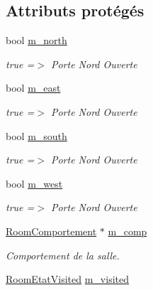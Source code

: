 \subsection*{Attributs protégés}
\begin{DoxyCompactItemize}
\item 
\hypertarget{class_room_aeb245b2ac8baea5fe4aa2b581ce1e4b9}{bool \hyperlink{class_room_aeb245b2ac8baea5fe4aa2b581ce1e4b9}{m\-\_\-north}}\label{class_room_aeb245b2ac8baea5fe4aa2b581ce1e4b9}

\begin{DoxyCompactList}\small\item\em true =$>$ Porte Nord Ouverte \end{DoxyCompactList}\item 
\hypertarget{class_room_ab6e6bf0a1168694a27a13a8acf1452a2}{bool \hyperlink{class_room_ab6e6bf0a1168694a27a13a8acf1452a2}{m\-\_\-east}}\label{class_room_ab6e6bf0a1168694a27a13a8acf1452a2}

\begin{DoxyCompactList}\small\item\em true =$>$ Porte Nord Ouverte \end{DoxyCompactList}\item 
\hypertarget{class_room_aac69181b1659a52d6e0259f7bfaae182}{bool \hyperlink{class_room_aac69181b1659a52d6e0259f7bfaae182}{m\-\_\-south}}\label{class_room_aac69181b1659a52d6e0259f7bfaae182}

\begin{DoxyCompactList}\small\item\em true =$>$ Porte Nord Ouverte \end{DoxyCompactList}\item 
\hypertarget{class_room_a645eb7a60abecb39a933f6ddd66c907d}{bool \hyperlink{class_room_a645eb7a60abecb39a933f6ddd66c907d}{m\-\_\-west}}\label{class_room_a645eb7a60abecb39a933f6ddd66c907d}

\begin{DoxyCompactList}\small\item\em true =$>$ Porte Nord Ouverte \end{DoxyCompactList}\item 
\hypertarget{class_room_a2eef23a19d68165b2afda676156fec0f}{\hyperlink{class_room_comportement}{Room\-Comportement} $\ast$ \hyperlink{class_room_a2eef23a19d68165b2afda676156fec0f}{m\-\_\-comp}}\label{class_room_a2eef23a19d68165b2afda676156fec0f}

\begin{DoxyCompactList}\small\item\em Comportement de la salle. \end{DoxyCompactList}\item 
\hypertarget{class_room_aa1641c60eea54c1633d3d1b4f04b34d0}{\hyperlink{class_room_etat_visited}{Room\-Etat\-Visited} \hyperlink{class_room_aa1641c60eea54c1633d3d1b4f04b34d0}{m\-\_\-visited}}\label{class_room_aa1641c60eea54c1633d3d1b4f04b34d0}


\end{DoxyCompactItemize}
